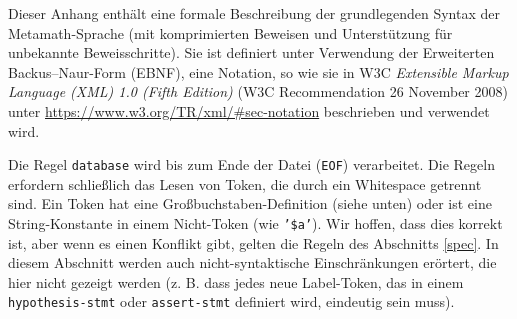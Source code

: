 Dieser Anhang enthält eine formale Beschreibung der grundlegenden Syntax der Metamath-Sprache (mit komprimierten Beweisen und Unterstützung für unbekannte Beweisschritte). Sie ist definiert unter Verwendung der Erweiterten Backus--Naur-Form (EBNF), eine Notation, so wie sie in W3C \textit{Extensible Markup Language (XML) 1.0 (Fifth Edition)} (W3C Recommendation 26 November 2008) unter \url{https://www.w3.org/TR/xml/#sec-notation} beschrieben und verwendet wird.

Die Regel \texttt{database} wird bis zum Ende der Datei (\texttt{EOF}) verarbeitet. Die Regeln erfordern schließlich das Lesen von Token, die durch ein Whitespace getrennt sind. Ein Token hat eine Großbuchstaben-Definition (siehe unten) oder ist eine String-Konstante in einem Nicht-Token (wie \texttt{'\$a'}). Wir hoffen, dass dies korrekt ist, aber wenn es einen Konflikt gibt, gelten die Regeln des Abschnitts \ref{spec}. In diesem Abschnitt werden auch nicht-syntaktische Einschränkungen erörtert, die hier nicht gezeigt werden (z. B. dass jedes neue Label-Token, das in einem \texttt{hypothesis-stmt} oder \texttt{assert-stmt} definiert wird, eindeutig sein muss).

